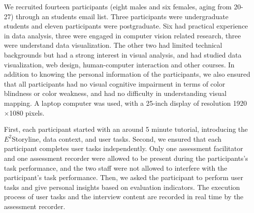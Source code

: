 \documentclass[review,journal]{vgtc}         %
\begin{document}
We recruited fourteen participants (eight males and six females, aging from 20-27) through an students email list.
Three participants were undergraduate students and eleven participants were postgraduate.
Six had practical experience in data analysis, three were engaged in computer vision related research, three were understand data visualization.
The other two had limited technical backgrounds but had a strong interest in visual analysis, and had studied data visualization, web design, human-computer interaction and other courses.
In addition to knowing the personal information of the participants, we also ensured that all participants had no visual cognitive impairment in terms of color blindness or color weakness, and had no difficulty in understanding visual mapping.
A laptop computer was used, with a 25-inch display of resolution 1920$\times$1080 pixels.

First, each participant started with an around 5 minute tutorial, introducing the $E^2$Storyline, data context, and user tasks.
Second, we ensured that each participant completes user tasks independently. Only one assessment facilitator and one assessment recorder were allowed to be present during the participants's task performance, and the two staff were not allowed to interfere with the participant's task performance.
Then, we asked the participant to perform user tasks and give personal insights based on evaluation indicators.
The execution process of user tasks and the interview content are recorded in real time by the assessment recorder.
\end{document}
